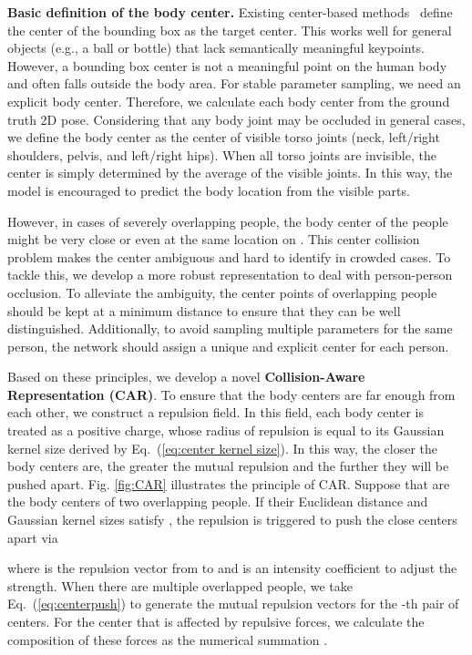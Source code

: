 \documentclass[10pt,twocolumn,letterpaper]{article}
\begin{document}
\textbf{Basic definition of the body center.} Existing center-based methods~\cite{duan2019centernet,zhou2019objects} define the center of the bounding box as the target center. 
This works well for general objects (e.g., a ball or bottle) that lack semantically meaningful keypoints.
However, a bounding box center is not a meaningful point on the human body and often falls outside the body area.
For stable parameter sampling, we need an explicit body center.
Therefore, we calculate each body center from the ground truth 2D pose. 
Considering that any body joint may be occluded in general cases, we define the body center as the center of visible torso joints (neck, left/right shoulders, pelvis, and left/right hips). 
When all torso joints are invisible, the center is simply determined by the average of the visible joints.
In this way, the model is encouraged to predict the body location from the visible parts. 

However, in cases of severely overlapping people, the body center of the people might be very close or even at the same location on .
This center collision problem makes the center ambiguous and hard to identify in crowded cases.
To tackle this, we develop a more robust representation to deal with person-person occlusion.
To alleviate the ambiguity, the center points of overlapping people should be kept at a minimum distance to ensure that they can be well distinguished. 
Additionally, to avoid sampling multiple parameters for the same person, the network should assign a unique and explicit center for each person.

Based on these principles, we develop a novel \textbf{Collision-Aware Representation (CAR)}. 
To ensure that the body centers are far enough from each other, we construct a repulsion field. 
In this field, each body center is treated as a positive charge, whose radius of repulsion is equal to its Gaussian kernel size derived by Eq.~(\ref{eq:center kernel size}).
In this way, the closer the body centers are, the greater the mutual repulsion and the further they will be pushed apart. 
Fig. \ref{fig:CAR} illustrates the principle of CAR.  
Suppose that  are the  body centers of two overlapping people. 
If  their Euclidean distance  and Gaussian kernel sizes  satisfy  , the repulsion is triggered to push the close centers apart  via

where  is the repulsion vector from  to  and  is an intensity coefficient to adjust the strength. When there are  multiple overlapped people, we take Eq.~(\ref{eq:centerpush}) to generate the mutual repulsion vectors  for the -th pair of centers. For the center that is affected by   repulsive forces, we calculate the composition of these forces as the numerical summation .
\end{document}

